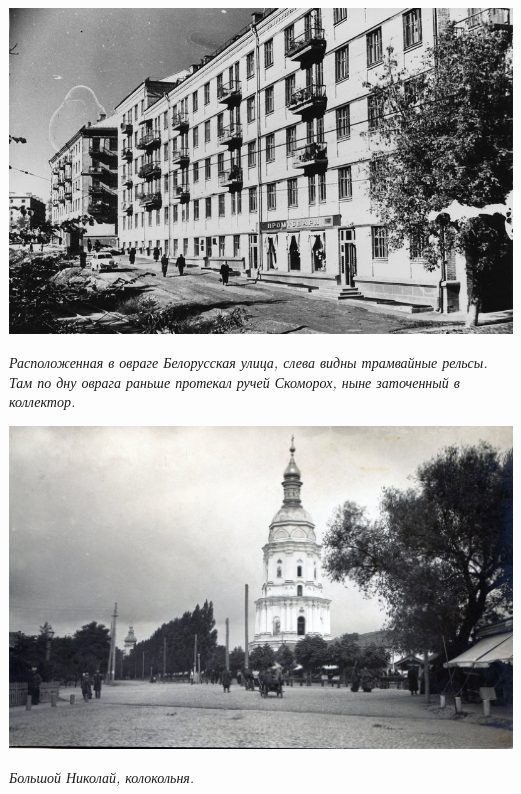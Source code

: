 \begin{center}
\includegraphics[width=\linewidth]{rpix/belor-14.jpg}

\textit{Расположенная в овраге Белорусская улица, слева видны трамвайные рельсы. Там по дну оврага раньше протекал ручей Скоморох, ныне заточенный в коллектор.}
\end{center}


\begin{center}
\includegraphics[width=\linewidth]{rpix/bolnikolay.jpg}

\textit{Большой Николай, колокольня.}
\end{center}



